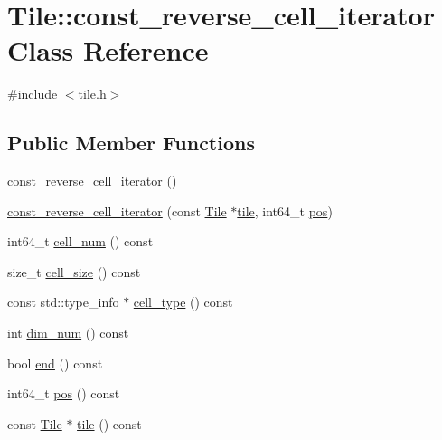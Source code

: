\hypertarget{classTile_1_1const__reverse__cell__iterator}{}\section{Tile\+:\+:const\+\_\+reverse\+\_\+cell\+\_\+iterator Class Reference}
\label{classTile_1_1const__reverse__cell__iterator}


{\ttfamily \#include $<$tile.\+h$>$}

\subsection*{Public Member Functions}
\begin{DoxyCompactItemize}
\item 
\hyperlink{classTile_1_1const__reverse__cell__iterator_abdbc2362f434bf2bbcdbed8b9fe772f7}{const\+\_\+reverse\+\_\+cell\+\_\+iterator} ()
\item 
\hyperlink{classTile_1_1const__reverse__cell__iterator_ad8075378f951d1583d4ded56ae4ed418}{const\+\_\+reverse\+\_\+cell\+\_\+iterator} (const \hyperlink{classTile}{Tile} $\ast$\hyperlink{classTile_1_1const__reverse__cell__iterator_a22c128c6fb3f9bc929922c0aa14bf5be}{tile}, int64\+\_\+t \hyperlink{classTile_1_1const__reverse__cell__iterator_a27a702fafecfccfaf7b07c20b68823ea}{pos})
\item 
int64\+\_\+t \hyperlink{classTile_1_1const__reverse__cell__iterator_a12a0bfe77571699775183a234e64b9d1}{cell\+\_\+num} () const 
\item 
size\+\_\+t \hyperlink{classTile_1_1const__reverse__cell__iterator_a7ced55585c64c9046dff1bfc50de71db}{cell\+\_\+size} () const 
\item 
const std\+::type\+\_\+info $\ast$ \hyperlink{classTile_1_1const__reverse__cell__iterator_a6dcfffeaa765abcb665beee43cd22748}{cell\+\_\+type} () const 
\item 
int \hyperlink{classTile_1_1const__reverse__cell__iterator_a7c82330f393e19027c4ebf0242f09b16}{dim\+\_\+num} () const 
\item 
bool \hyperlink{classTile_1_1const__reverse__cell__iterator_a1671d685e0e67839356114e791fa86ee}{end} () const 
\item 
int64\+\_\+t \hyperlink{classTile_1_1const__reverse__cell__iterator_a27a702fafecfccfaf7b07c20b68823ea}{pos} () const 
\item 
const \hyperlink{classTile}{Tile} $\ast$ \hyperlink{classTile_1_1const__reverse__cell__iterator_a22c128c6fb3f9bc929922c0aa14bf5be}{tile} () const 

\end{DoxyCompactItemize}
